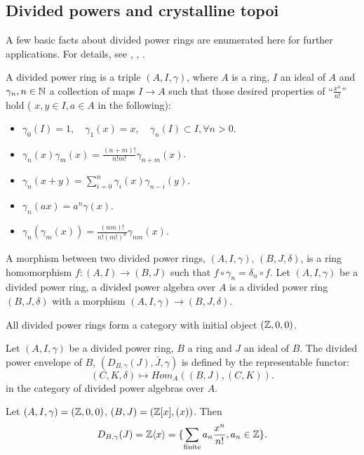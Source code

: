 \subsection{Divided powers and crystalline topoi}
A few basic facts about divided power rings are enumerated here for further applications. 
For details, see \cite{Sta}, \cite{BO}, \cite{Be2}.
\begin{definition}
    A divided power ring is a triple $(A, I, \gamma)$, 
    where $A$ is a ring, $I$ an ideal of $A$ and $\gamma_n, n \in {\mathbb {N}}$ 
    a collection of maps $I \to A$ 
    such that those desired properties of ``$\frac {x^n} {n!}$'' hold 
    ( $x, y \in I,a \in A$ in the following):
    \begin{itemize} 
        \item 
            $\gamma_0(I) = 1,\quad \gamma_1(x) = x, 
            \quad \gamma_n(I) \subset I,\forall n > 0$.
        \item 
            $\gamma_n(x) \gamma_m(x) = 
            \frac {(n+m)!} {n!m!} \gamma_{n+m}(x)$.
        \item 
            $\gamma_n(x+y) = 
            \sum_{i = 0}^n \gamma_i (x) \gamma_{n-i}(y)$.
        \item 
            $\gamma_n(ax) = a^n \gamma(x)$.
        \item 
            $\gamma_n(\gamma_m(x)) = 
            \frac{(nm)!} {n!(m!)^n} \gamma_{nm}(x)$.
    \end{itemize}
    A morphism between two divided power rings, 
    $(A, I, \gamma)$, $(B, J, \delta)$, 
    is a ring homomorphism $f\colon (A,I) \to (B,J)$ such that 
    $f \circ \gamma_n = \delta_n \circ f$. 
    Let $(A, I, \gamma)$ be a divided power ring, 
    a divided power algebra over $A$ is a divided power ring $(B, J, \delta)$ with 
    a morphism $(A, I, \gamma)\to (B, J, \delta)$.
\end{definition}

All divided power rings form a category with initial object $({\mathbb {Z}}, 0, 0)$.
\begin{definition}
    Let $(A, I, \gamma)$ be a divided power ring, 
    $B$ a ring and $J$ an ideal of $B$. 
    The divided power envelope of $B$, $(D_{B, \gamma}(J), \bar{J}, \gamma)$ 
    is defined by the representable functor:
    \[
        (C, K, \delta) \mapsto Hom_A ((B, J), (C, K)).
    \]
    in the category of divided power algebras over $A$.
\end{definition}

\begin{example}
    Let $(A, I, \gamma) = ({\mathbb {Z}}, 0, 0)$, $(B, J)=({\mathbb {Z}}[x], (x))$. 
    Then
    \[
        D_{B, \gamma}(J) = {\mathbb {Z}} \langle x \rangle = 
        \{\sum_{\text{finite}} a_n \frac{x^n}{n!}, a_n \in \mathbb{Z}\}.
    \]
\end{example}

